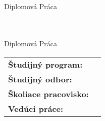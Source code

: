 \newcommand{\coverTop}{
    \begin{center}
        {\textbf \Large \textsc {\settingsSchool \\ \settingsFaculty}}
        \vfill
        {\LARGE \em \settingsTitle} \\ {\large Diplomová Práca}
    \end{center}
}

\newcommand{\coverCenter}{
    \begin{tabular}{l l}
        \textbf{Študijný program:} & \settingsProgramme \\
        \textbf{Študijný odbor:} & \settingsField \\
        \textbf{Školiace pracovisko:} & \settingsDepartment \\
        \textbf{Vedúci práce:} &  \settingsAdvisor
    \end{tabular}
}

\newcommand{\coverBottom}{
    \begin{center}
        \textbf{\settingsYear \hfill \settingsAuthor}
    \end{center}
}

\thispagestyle{empty}
\coverTop
\vfill
\coverBottom
\newpage

\thispagestyle{empty}
\coverTop
\vfill
\coverCenter
\vfill
\coverBottom
\newpage

